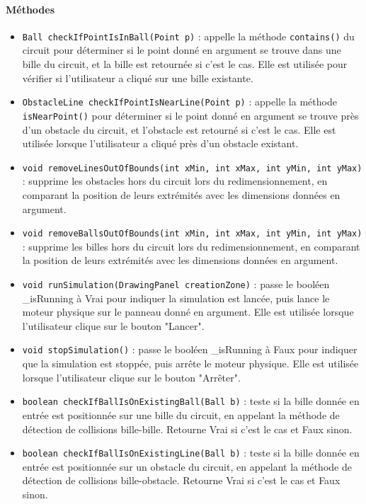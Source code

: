\documentclass{report}
\begin{document}
\paragraph*{Méthodes}
\begin{itemize}
\item \texttt{Ball checkIfPointIsInBall(Point p)} : appelle la méthode \texttt{contains()} du circuit pour déterminer si le point donné en argument se trouve dans une bille du circuit, et la bille est retournée si c'est le cas. Elle est utilisée pour vérifier si l'utilisateur a cliqué sur une bille existante.
\item \texttt{ObstacleLine checkIfPointIsNearLine(Point p)} : appelle la méthode \texttt{isNearPoint()} pour déterminer si le point donné en argument se trouve près d'un obstacle du circuit, et l'obstacle est retourné si c'est le cas. Elle est utilisée lorsque l'utilisateur a cliqué près d'un obstacle existant.
\item \texttt{void removeLinesOutOfBounds(int xMin, int xMax, int yMin, int yMax)} : supprime les obstacles hors du circuit lors du redimensionnement, en comparant la position de leurs extrémités avec les dimensions données en argument.
\item \texttt{void removeBallsOutOfBounds(int xMin, int xMax, int yMin, int yMax)} : supprime les billes hors du circuit lors du redimensionnement, en comparant la position de leurs extrémités avec les dimensions données en argument.
\item \texttt{void runSimulation(DrawingPanel creationZone)} : passe le booléen \_isRunning à Vrai pour indiquer la simulation est lancée, puis lance le moteur physique sur le panneau donné en argument. Elle est utilisée lorsque l'utilisateur clique sur le bouton "Lancer".
\item \texttt{void stopSimulation()} : passe le booléen \_isRunning à Faux pour indiquer que la simulation est stoppée, puis arrête le moteur physique. Elle est utilisée lorsque l'utilisateur clique sur le bouton "Arrêter".
\item \texttt{boolean checkIfBallIsOnExistingBall(Ball b)} : teste si la bille donnée en entrée est positionnée sur une bille du circuit, en appelant la méthode de détection de collisions bille-bille. Retourne Vrai si c'est le cas et Faux sinon.
\item \texttt{boolean checkIfBallIsOnExistingLine(Ball b)} : teste si la bille donnée en entrée est positionnée sur un obstacle du circuit, en appelant la méthode de détection de collisions bille-obstacle. Retourne Vrai si c'est le cas et Faux sinon.

\end{itemize}
\end{document}
